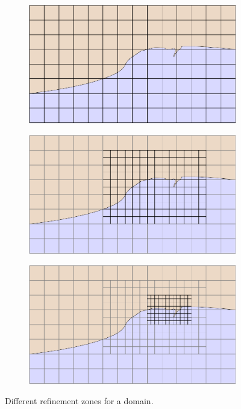 \begin{figure}
\centering
\begin{subfigure}{.8\textwidth}
    \includegraphics[width=\textwidth]{img/multigrid/grid1.pdf}
    \vspace{1em}
\end{subfigure}
\begin{subfigure}{.8\textwidth}
    \includegraphics[width=\textwidth]{img/multigrid/grid2.pdf}
    \vspace{1em}
\end{subfigure}
\begin{subfigure}{.8\textwidth}
    \includegraphics[width=\textwidth]{img/multigrid/grid3.pdf}
    \vspace{1em}
\end{subfigure}
\caption{Different refinement zones for a domain.}
\label{multigrid_refinement}
\end{figure}



